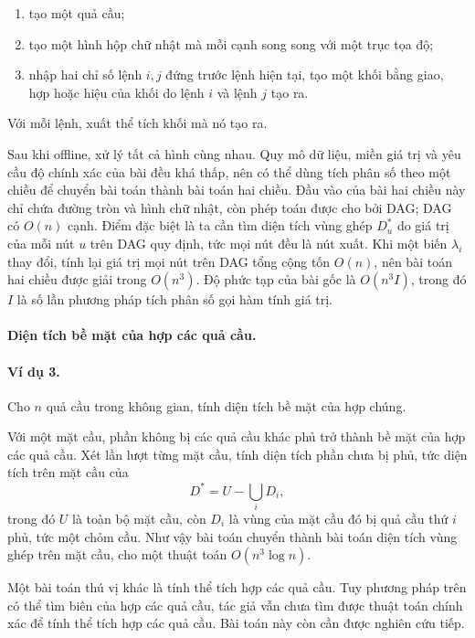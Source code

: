 \documentclass[11pt]{article}
\begin{document}
\begin{enumerate}
  \item tạo một quả cầu;
  \item tạo một hình hộp chữ nhật mà mỗi cạnh song song với một trục tọa độ;
  \item nhập hai chỉ số lệnh \(i,j\) đứng trước lệnh hiện tại, tạo một khối
  bằng giao, hợp hoặc hiệu của khối do lệnh \(i\) và lệnh \(j\) tạo ra.
\end{enumerate}

Với mỗi lệnh, xuất thể tích khối mà nó tạo ra.

Sau khi offline, xử lý tất cả hình cùng nhau. Quy mô dữ liệu, miền giá trị và
yêu cầu độ chính xác của bài đều khá thấp, nên có thể dùng tích phân số theo
một chiều để chuyển bài toán thành bài toán hai chiều. Đầu vào của bài hai
chiều này chỉ chứa đường tròn và hình chữ nhật, còn phép toán được cho bởi DAG;
DAG có \(O(n)\) cạnh. Điểm đặc biệt là ta cần tìm diện tích vùng ghép \(D^*_u\)
do giá trị của mỗi nút \(u\) trên DAG quy định, tức mọi nút đều là nút xuất.
Khi một biến \(\lambda_i\) thay đổi, tính lại giá trị mọi nút trên DAG tổng
cộng tốn \(O(n)\), nên bài toán hai chiều được giải trong \(O(n^3)\). Độ phức
tạp của bài gốc là \(O(n^3I)\), trong đó \(I\) là số lần phương pháp tích phân
số gọi hàm tính giá trị.

\paragraph{Diện tích bề mặt của hợp các quả cầu.}

\paragraph{Ví dụ 3.}
Cho \(n\) quả cầu trong không gian, tính diện tích bề mặt của hợp chúng.

Với một mặt cầu, phần không bị các quả cầu khác phủ trở thành bề mặt của hợp
các quả cầu. Xét lần lượt từng mặt cầu, tính diện tích phần chưa bị phủ, tức
diện tích trên mặt cầu của
\[
  D^*=U-\bigcup_i D_i,
\]
trong đó \(U\) là toàn bộ mặt cầu, còn \(D_i\) là vùng của mặt cầu đó bị quả
cầu thứ \(i\) phủ, tức một chỏm cầu. Như vậy bài toán chuyển thành bài toán
diện tích vùng ghép trên mặt cầu, cho một thuật toán \(O(n^3\log n)\).

Một bài toán thú vị khác là tính thể tích hợp các quả cầu. Tuy phương pháp trên
có thể tìm biên của hợp các quả cầu, tác giả vẫn chưa tìm được thuật toán chính
xác để tính thể tích hợp các quả cầu. Bài toán này còn cần được nghiên cứu
tiếp.
\end{document}

